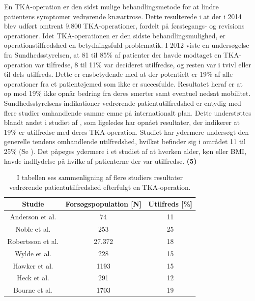 En TKA-operation er den sidst mulige behandlingsmetode for at lindre patientens symptomer vedrørende knæartrose. Dette resulterede i at der i 2014 blev udført omtrent 9.800 TKA-operationer, fordelt på førstegangs- og revisions operationer. \citep{aarsrapport2016} Idet TKA-operationen er den sidste behandlingsmulighed, er operationstilfredshed en betydningsfuld problematik. I 2012 viste en undersøgelse fra Sundhedsstyrelsen, at 81 til 85\% af patienter der havde modtaget en TKA-operation var tilfredse, 8 til 11\% var decideret utilfredse, og resten var i tvivl eller til dels utilfreds. Dette er ensbetydende med at der potentielt er 19\% af alle operationer fra et patientøjemed som ikke er succesfulde. Resultatet heraf er at op mod 19\% ikke opnår bedring fra deres smerter samt eventuel nedsat mobilitet. \citep{brostrom2012} Sundhedsstyrelsens indikationer vedrørende patientutilfredshed er entydig med flere studier omhandlende samme emne på internationalt plan. Dette understøttes blandt andet i studiet af \cite{Bourne2010}, som ligeledes har opnået resultater, der indikerer at 19\% er utilfredse med deres TKA-operation. Studiet har ydermere undersøgt den generelle tendens omhandlende utilfredshed, hvilket befinder sig i området 11 til 25\% (Se ). \citep{Bourne2010} Det påpeges ydermere i et studiet af \cite{Jacobs2014} at hverken alder, køn eller BMI, havde indflydelse på hvilke af patienterne der var utilfredse. \citep{Jacobs2014}   \textbf{(5)}
\begin{table}[H]
	\centering
\begin{tabular}{ccc}
	\hline
	\rowcolor[HTML]{C0C0C0} 
	Studie            & Forsøgspopulation {[}N{]} & Utilfreds {[}\%{]} \\ \hline
	Anderson et al.   & 74                        & 11                 \\
	Noble et al.      & 253                       & 25                 \\
	Robertsson et al. & 27.372                    & 18                 \\
	Wylde et al.      & 228                       & 15                 \\
	Hawker et al.     & 1193                      & 15                 \\
	Heck et al.       & 291                       & 12                 \\
	Bourne et al.     & 1703                      & 19                 \\ \hline
\end{tabular}
	\caption{I tabellen ses \cite{Bourne2010} sammenligning af flere studiers resultater vedrørende patientutilfredshed efterfulgt en TKA-operation. \citep{Bourne2010}}
	\label{tab:patient_utilfreds}
\end{table}

